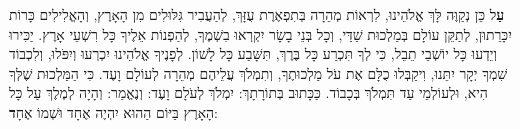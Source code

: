 \textbf{עַ}ל כֵּן נְקַוֶּה לָּךְ \Shem{} אֱלֹהֵינוּ, לִרְאוֹת מְהֵרָה בְּתִפְאֶרֶת עֻזָּךְ, לְהַעֲבִיר גִּלּוּלִים מִן הָאָרֶץ, וְהָאֱלִילִים כָּרוֹת יִכָּרֵתוּן, לְתַקֵּן עוֹלָם בְּמַלְכוּת שַׁדַּי, וְכָל בְּנֵי בָשָׂר יִקְרְאוּ בִשְׁמֶךָ, לְהַפְנוֹת אֵלֶיךָ כָּל רִשְׁעֵי אָרֶץ. יַכִּירוּ וְיֵדְעוּ כָּל יוֹשְׁבֵי תֵבֵל, כִּי לְךָ תִּכְרַע כָּל בֶּרֶךְ, תִּשָּׁבַע כָּל לָשׁוֹן. לְפָנֶיךָ \Shem{} אֱלֹהֵינוּ יִכְרְעוּ וְיִפֹּלוּ, וְלִכְבוֹד שִׁמְךָ יְקָר יִתֵּנוּ, וִיקַבְּלוּ כֻלָּם אֶת עֹל מַלְכוּתֶךָ, וְתִמְלֹךְ עֲלֵיהֶם מְהֵרָה לְעוֹלָם וָעֶד. כִּי הַמַּלְכוּת שֶׁלְּךָ הִיא, וּלְעוֹלְמֵי עַד תִּמְלֹךְ בְּכָבוֹד. כַּכָּתוּב בְּתוֹרָתָךְ: \Shem{} יִמְלֹךְ לְעֹלָם וָעֶד: וְנֶאֱמַר: וְהָיָה \Shem{} לְמֶלֶךְ עַל כָּל הָאָרֶץ בַּיּוֹם הַהוּא יִהְיֶה \Shem{} אֶחָד וּשְׁמוֹ אֶחָ\textbf{ד}:
